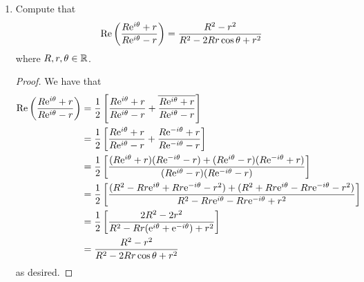 \documentclass[../psets.tex]{subfiles}
\begin{document}
\begin{enumerate}[ref={A.\arabic*}]
\begin{enumerate}
        \begin{proof}
            Since $f\in\mO(\D)$, $D:=D_R(0)\subset\subset\D$, and $z\in D$, the CIF tells us that
            \begin{equation*}
                f(z) = \frac{1}{2\pi i}\int_{\partial D}\frac{f(\zeta)}{\zeta-z}\dd\zeta
            \end{equation*}
            Parameterize $\partial D$ by $\zeta=R\e[i\theta]$ for $\theta\in[0,2\pi]$. Then, substituting into the above,
            \begin{align*}
                f(z) &= \frac{1}{2\pi i}\int_0^{2\pi}f(R\e[i\theta])\frac{1}{R\e[i\theta]-z}\cdot iR\e[i\theta]\dd\theta\\
                &= \frac{1}{2\pi}\int_0^{2\pi}f(R\e[i\theta])\frac{R\e[i\theta]}{R\e[i\theta]-z}\dd\theta
            \end{align*}
        \end{proof}
        \item Compute that
        \begin{equation*}
            \re\left( \frac{R\e[i\theta]+r}{R\e[i\theta]-r} \right) = \frac{R^2-r^2}{R^2-2Rr\cos\theta+r^2}
        \end{equation*}
        where $R,r,\theta\in\R$.
        \begin{proof}
            We have that
            \begin{align*}
                \re\left( \frac{R\e[i\theta]+r}{R\e[i\theta]-r} \right) &= \frac{1}{2}\left[ \frac{R\e[i\theta]+r}{R\e[i\theta]-r}+\overline{\frac{R\e[i\theta]+r}{R\e[i\theta]-r}} \right]\\
                &= \frac{1}{2}\left[ \frac{R\e[i\theta]+r}{R\e[i\theta]-r}+\frac{R\e[-i\theta]+r}{R\e[-i\theta]-r} \right]\\
                &= \frac{1}{2}\left[ \frac{(R\e[i\theta]+r)(R\e[-i\theta]-r)+(R\e[i\theta]-r)(R\e[-i\theta]+r)}{(R\e[i\theta]-r)(R\e[-i\theta]-r)} \right]\\
                &= \frac{1}{2}\left[ \frac{(R^2-Rr\e[i\theta]+Rr\e[-i\theta]-r^2)+(R^2+Rr\e[i\theta]-Rr\e[-i\theta]-r^2)}{R^2-Rr\e[i\theta]-Rr\e[-i\theta]+r^2} \right]\\
                &= \frac{1}{2}\left[ \frac{2R^2-2r^2}{R^2-Rr(\e[i\theta]+\e[-i\theta])+r^2} \right]\\
                &= \frac{R^2-r^2}{R^2-2Rr\cos\theta+r^2}
            \end{align*}
            as desired.
        \end{proof}

\end{enumerate}
\end{enumerate}
\end{document}
